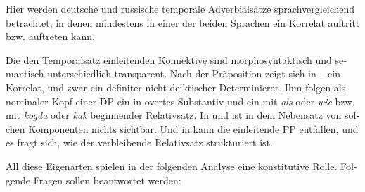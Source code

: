 \documentclass[output=paper, colorlinks, citecolor=brown, booklanguage=german]{langscibook}
\begin{document}
\begin{otherlanguage}{german}
Hier werden deutsche und russische temporale Adverbialsätze sprach\-ver\-glei\-chend betrachtet, in denen mindestens in einer der beiden Sprachen ein Korrelat auftritt bzw. auftreten kann.

\ea \label{ex:18:3}
	\z
\z

\ea \label{ex:18:4}
	\z
\z 

\ea \label{ex:18:5}
	\z
\z 

\noindent Die den Temporalsatz einleitenden Konnektive sind morphosyntaktisch und semantisch unterschiedlich transparent. Nach der Präposition zeigt sich in -- ein Korrelat, und zwar ein definiter nicht-deiktischer Determinierer. Ihm folgen als nominaler Kopf einer DP ein in  overtes Substantiv und ein mit \textit{als} oder \textit{wie} bzw. mit \textit{kogda} oder \textit{kak} beginnender Relativsatz. In  und  ist in dem Nebensatz von solchen Komponenten nichts sichtbar. Und in  kann die ein\-lei\-ten\-de PP entfallen, und es fragt sich, wie der verbleibende Relativsatz strukturiert ist.

All diese Eigenarten spielen in der folgenden Analyse eine konstitutive Rolle. Folgende Fragen sollen beantwortet werden:


\end{otherlanguage}
\end{document}
